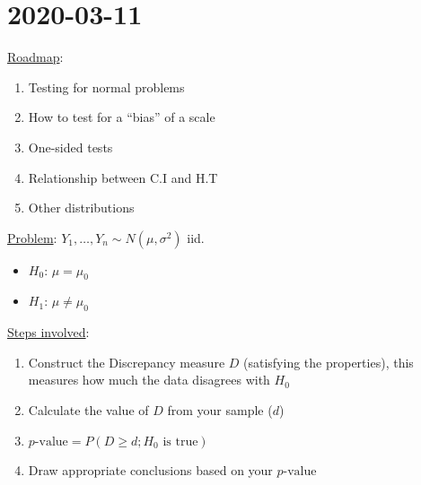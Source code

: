 \section{2020-03-11}
\underline{Roadmap}:
\begin{enumerate}[label=(\roman*)]
    \item Testing for normal problems
    \item How to test for a ``bias'' of a scale
    \item One-sided tests
    \item Relationship between C.I and H.T
    \item Other distributions
\end{enumerate}
\underline{Problem}: $ Y_1,\ldots ,Y_n \sim N(\mu,\sigma^2) $ iid.
\begin{itemize}
    \item $ H_0 $: $ \mu=\mu_0 $
    \item $ H_1 $: $ \mu\neq \mu_0 $
\end{itemize}
\underline{Steps involved}:
\begin{enumerate}[label=(\roman*)]
    \item Construct the Discrepancy measure $ D $ (satisfying the properties), this
          measures how much the data disagrees with $ H_0 $
    \item Calculate the value of $ D $ from your sample ($ d $)
    \item $ p\text{-value}=P(D\geqslant d; H_0\text{ is true}) $
    \item Draw appropriate conclusions based on your $ p\text{-value} $
\end{enumerate}
